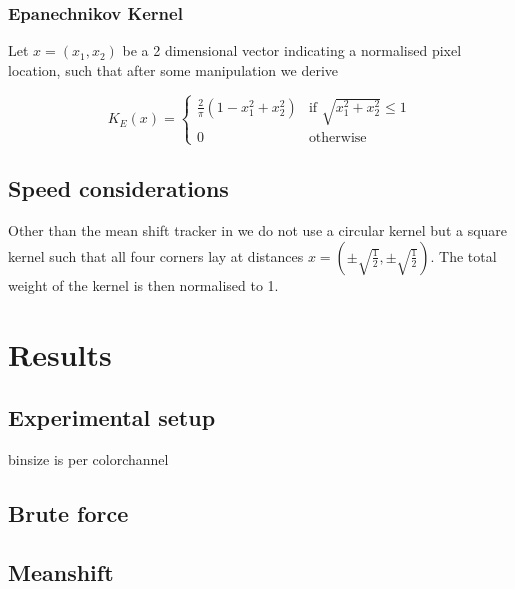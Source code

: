 \documentclass[a4paper,11pt]{article}
\begin{document}
\subsubsection{Epanechnikov Kernel}



Let $x = (x_1,x_2)$ be a 2 dimensional vector indicating a normalised pixel location, such that after some manipulation we derive

\begin{equation}

\label{eq:epanechnikov_kernel2}

K_E(x) = \left\{ \begin{array}{cl}

  \frac{2}{\pi} (1-x_1^2 + x_2^2) & \textrm{if } \sqrt{x_1^2 + x_2^2} \leq 1 \\

  0 & \textrm{otherwise} \end{array}\right.

\end{equation}



\subsection{Speed considerations}



Other than the mean shift tracker in \cite{mean_shift} we do not use a circular kernel but a square kernel such that all four corners lay at distances $x=(\pm \sqrt{\frac{1}{2}},\pm \sqrt{\frac{1}{2}})$. The total weight of the kernel is then normalised to 1.

\section{Results} 

	\subsection{Experimental setup} 

	binsize is per colorchannel

	\subsection{Brute force} 

	\subsection{Meanshift} 
\end{document}
